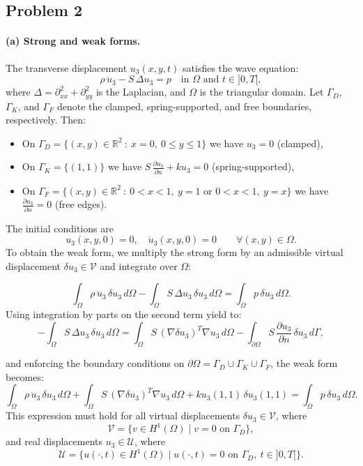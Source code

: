 \documentclass[12pt]{article}
\begin{document}
\subsection*{Problem 2}
\paragraph*{(a) Strong and weak forms.} The transverse displacement \( u_3(x, y, t) \) satisfies the wave equation:
\[
	\rho \, \ddot{u}_3 - S \, \Delta u_3 = p\quad \text{in } \Omega \text{ and } t\in]0,T[,
\]
where \( \Delta = \partial_{xx}^2 + \partial_{yy}^2 \) is the Laplacian, and \( \Omega \) is the triangular domain. Let \( \Gamma_D \), \( \Gamma_K \), and \( \Gamma_F \) denote the clamped, spring-supported, and free boundaries, respectively. Then:

\begin{itemize}
	\item On \( \Gamma_D =\{(x,y)\in\mathbb R^2\ :\ x=0,\ 0\leq y\leq 1\}\) we have \( u_3 = 0 \) (clamped),
	\item On \( \Gamma_K=\{(1,1)\} \) we have \( S \, \frac{\partial u_3}{\partial n} + k u_3 = 0 \) (spring-supported),
	\item On \( \Gamma_F=\{(x,y)\in\mathbb R^2\ :\ 0< x<1,\ y=1 \text{ or } 0< x<1,\ y=x\} \) we have \( \frac{\partial u_3}{\partial n} = 0 \) (free edges).
\end{itemize}
The initial conditions are
\[
	u_3(x, y, 0) = 0, \quad \dot{u}_3(x, y, 0) = 0 \qquad \forall (x,y)\in\Omega.
\]
To obtain the weak form, we multiply the strong form by an admissible virtual displacement \( \delta u_3 \in \mathcal{V} \) and integrate over \( \Omega \):

\[
	\int_{\Omega} \rho \, \ddot{u}_3 \, \delta u_3 \, d\Omega - \int_{\Omega} S \, \Delta u_3 \, \delta u_3 \, d\Omega = \int_{\Omega} p \, \delta u_3 \, d\Omega.
\]
Using integration by parts on the second term yield to:
\[
	-\int_{\Omega} S \, \Delta u_3 \, \delta u_3 \, d\Omega=\int_{\Omega} S \, (\nabla \delta u_3)^T\nabla u_3 \, d\Omega - \int_{\partial \Omega} S \, \frac{\partial u_3}{\partial n} \, \delta u_3 \, d\Gamma,
\]

and enforcing the boundary conditions on \(\partial \Omega= \Gamma_D\cup  \Gamma_K\cup  \Gamma_F \), the weak form becomes:
\[
	\int_{\Omega} \rho \, \ddot{u}_3 \, \delta u_3 \, d\Omega + \int_{\Omega} S \, (\nabla \delta u_3)^T\nabla u_3 \, d\Omega  + k u_3(1,1)\, \delta u_3(1,1) = \int_{\Omega} p \, \delta u_3 \, d\Omega .
\]
This expression must hold for all virtual displacements \( \delta u_3 \in \mathcal{V} \), where
\[
	\mathcal{V} = \{ v \in H^1(\Omega) \mid v = 0 \text{ on } \Gamma_D \},
\]
and real displacements \( u_3 \in \mathcal{U} \), where
\[
	\mathcal{U} = \{ u(\cdot,t) \in H^1(\Omega) \mid u(\cdot,t) = 0 \text{ on } \Gamma_D,\ t\in]0,T[ \}.
\]
\end{document}
